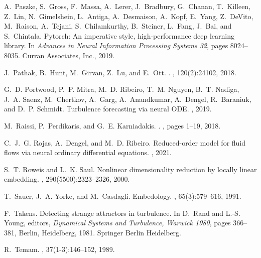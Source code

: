 \documentclass[preprint,aps,pre,letterpaper,onecolumn,superscriptaddress]{revtex4-2} %
\begin{document}
\begin{thebibliography}{10}
A.~Paszke, S.~Gross, F.~Massa, A.~Lerer, J.~Bradbury, G.~Chanan, T.~Killeen,
  Z.~Lin, N.~Gimelshein, L.~Antiga, A.~Desmaison, A.~Kopf, E.~Yang, Z.~DeVito,
  M.~Raison, A.~Tejani, S.~Chilamkurthy, B.~Steiner, L.~Fang, J.~Bai, and
  S.~Chintala.
\newblock Pytorch: An imperative style, high-performance deep learning library.
\newblock In {\em Advances in Neural Information Processing Systems 32}, pages
  8024--8035. Curran Associates, Inc., 2019.

J.~Pathak, B.~Hunt, M.~Girvan, Z.~Lu, and E.~Ott.
.
, 120(2):24102, 2018.

G.~D. Portwood, P.~P. Mitra, M.~D. Ribeiro, T.~M. Nguyen, B.~T. Nadiga, J.~A.
  Saenz, M.~Chertkov, A.~Garg, A.~Anandkumar, A.~Dengel, R.~Baraniuk, and D.~P.
  Schmidt.
\newblock Turbulence forecasting via neural {ODE}.
, 2019.

M.~Raissi, P.~Perdikaris, and G.~E. Karniadakis.
.
, pages 1--19, 2018.

C.~J.~G. Rojas, A.~Dengel, and M.~D. Ribeiro.
\newblock Reduced-order model for fluid flows via neural ordinary differential
  equations.
, 2021.

S.~T. Roweis and L.~K. Saul.
\newblock Nonlinear dimensionality reduction by locally linear embedding.
, 290(5500):2323--2326, 2000.

T.~Sauer, J.~A. Yorke, and M.~Casdagli.
\newblock Embedology.
, 65(3):579--616, 1991.

F.~Takens.
\newblock Detecting strange attractors in turbulence.
\newblock In D.~Rand and L.-S. Young, editors, {\em Dynamical Systems and
  Turbulence, Warwick 1980}, pages 366--381, Berlin, Heidelberg, 1981. Springer
  Berlin Heidelberg.

R.~Temam.
, 37(1-3):146--152, 1989.


\end{thebibliography}
\end{document}
